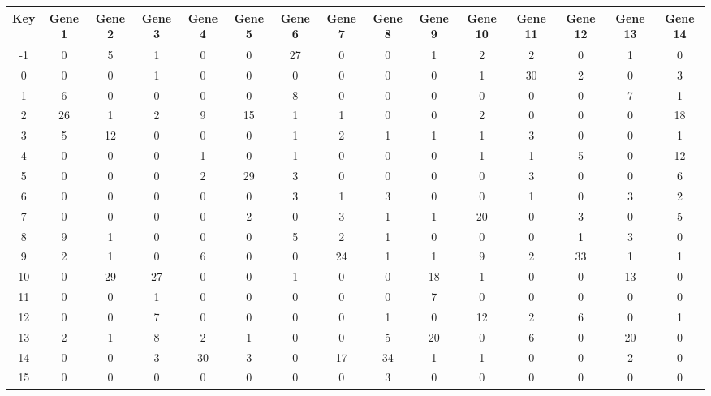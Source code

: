 \begin{tabular}{|c|c|c|c|c|c|c|c|c|c|c|c|c|c|c|}
\hline
Key & Gene 1 & Gene 2 & Gene 3 & Gene 4 & Gene 5 & Gene 6 & Gene 7 & Gene 8 & Gene 9 & Gene 10 & Gene 11 & Gene 12 & Gene 13 & Gene 14 \\
\hline
-1 & 0 & 5 & 1 & 0 & 0 & 27 & 0 & 0 & 1 & 2 & 2 & 0 & 1 & 0 \\
0 & 0 & 0 & 1 & 0 & 0 & 0 & 0 & 0 & 0 & 1 & 30 & 2 & 0 & 3 \\
1 & 6 & 0 & 0 & 0 & 0 & 8 & 0 & 0 & 0 & 0 & 0 & 0 & 7 & 1 \\
2 & 26 & 1 & 2 & 9 & 15 & 1 & 1 & 0 & 0 & 2 & 0 & 0 & 0 & 18 \\
3 & 5 & 12 & 0 & 0 & 0 & 1 & 2 & 1 & 1 & 1 & 3 & 0 & 0 & 1 \\
4 & 0 & 0 & 0 & 1 & 0 & 1 & 0 & 0 & 0 & 1 & 1 & 5 & 0 & 12 \\
5 & 0 & 0 & 0 & 2 & 29 & 3 & 0 & 0 & 0 & 0 & 3 & 0 & 0 & 6 \\
6 & 0 & 0 & 0 & 0 & 0 & 3 & 1 & 3 & 0 & 0 & 1 & 0 & 3 & 2 \\
7 & 0 & 0 & 0 & 0 & 2 & 0 & 3 & 1 & 1 & 20 & 0 & 3 & 0 & 5 \\
8 & 9 & 1 & 0 & 0 & 0 & 5 & 2 & 1 & 0 & 0 & 0 & 1 & 3 & 0 \\
9 & 2 & 1 & 0 & 6 & 0 & 0 & 24 & 1 & 1 & 9 & 2 & 33 & 1 & 1 \\
10 & 0 & 29 & 27 & 0 & 0 & 1 & 0 & 0 & 18 & 1 & 0 & 0 & 13 & 0 \\
11 & 0 & 0 & 1 & 0 & 0 & 0 & 0 & 0 & 7 & 0 & 0 & 0 & 0 & 0 \\
12 & 0 & 0 & 7 & 0 & 0 & 0 & 0 & 1 & 0 & 12 & 2 & 6 & 0 & 1 \\
13 & 2 & 1 & 8 & 2 & 1 & 0 & 0 & 5 & 20 & 0 & 6 & 0 & 20 & 0 \\
14 & 0 & 0 & 3 & 30 & 3 & 0 & 17 & 34 & 1 & 1 & 0 & 0 & 2 & 0 \\
15 & 0 & 0 & 0 & 0 & 0 & 0 & 0 & 3 & 0 & 0 & 0 & 0 & 0 & 0 \\
\hline
\end{tabular}